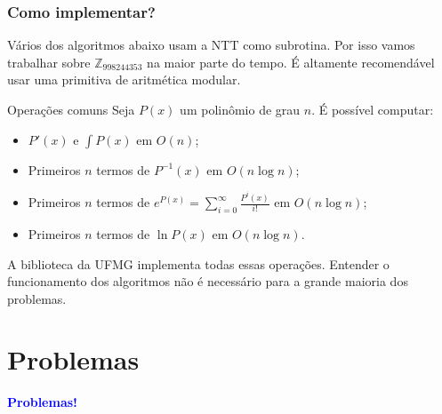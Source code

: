\documentclass{beamer}
\begin{document}
\begin{frame}
      \frametitle{Como implementar?}

      Vários dos algoritmos abaixo usam a NTT como subrotina. Por isso vamos trabalhar sobre $\mathbb{Z}_{998244353}$ na maior parte do tempo. É altamente recomendável usar uma primitiva de aritmética modular.

      \begin{block}{Operações comuns}
      Seja $P(x)$ um polinômio de grau $n$. É possível computar:
      \begin{itemize}
            \item $P'(x)$ e $\int P(x)$ em $O(n)$;
            \item Primeiros $n$ termos de $P^{-1}(x)$ em $O(n \log n)$;
            \item Primeiros $n$ termos de $e^{P(x)} = \sum_{i=0}^{\infty} \frac{P^i(x)}{i!}$ em $O(n \log n)$;
            \item Primeiros $n$ termos de $\ln P(x)$ em $O(n \log n)$.
      \end{itemize}
      \end{block}

      A biblioteca da UFMG implementa todas essas operações. Entender o funcionamento dos algoritmos não é necessário para a grande maioria dos problemas.


\end{frame}

\section{Problemas}
\begin{frame}

      \begin{center}
            {\LARGE \textcolor{blue}{\textbf{Problemas!}}}
      \end{center}
      
\end{frame}
\end{document}
